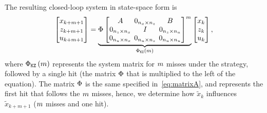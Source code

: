 The resulting closed-loop system in state-space form is
%
\begin{equation} 
    \setlength\arraycolsep{2pt}
    \label{eq:KZ}
    \begin{bmatrix}
        x_{k+\nummisses+1} \\
        z_{k+\nummisses+1} \\
        u_{k+\nummisses+1}
    \end{bmatrix} = 
    \underbrace{ \clmat{} \begin{bmatrix}
        \Ap                                         & 0_{n_x \times n_z}  & \Bp \\
        0_{n_z \times n_x}    & I                                         & 0_{n_z \times n_u} \\
        0_{n_u \times n_x}   & 0_{n_u \times n_z}   & 0_{n_u \times n_u}
    \end{bmatrix}^{\nummisses}}_{\clmat{}_{\Kill\Zero}\funof{\nummisses}}
    \begin{bmatrix}
        x_{k} \\
        z_{k} \\
        u_{k}
    \end{bmatrix},
\end{equation}
%
where $\Phi{}_{\texttt{K}\texttt{Z}}\left( m \right)$ represents the system matrix for $m$ misses under the \tKZ{} strategy, followed by a single hit (the matrix $\Phi{}$ that is multiplied to the left of the equation).
The matrix $\Phi{}$ is the same specified in~\eqref{eq:matrixA}, and represents the first hit that follows the $m$ misses, hence, we determine how $\tilde{x}_k$ influences $\tilde{x}_{k+m+1}$ ($m$ misses and one hit).

